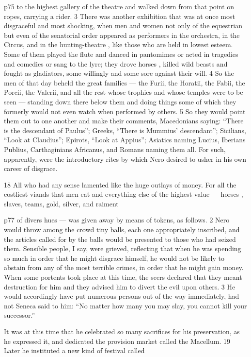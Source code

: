 p75 to the highest gallery of the theatre and walked down from that point on ropes, carrying a rider. 3 There was another exhibition that was at once most disgraceful and most shocking, when men and women not only of the equestrian but even of the senatorial order appeared as performers in the orchestra, in the Circus, and in the hunting-theatre , like those who are held in lowest esteem. Some of them played the flute and danced in pantomimes or acted in tragedies and comedies or sang to the lyre; they drove horses , killed wild beasts and fought as gladiators, some willingly and some sore against their will. 4 So the men of that day beheld the great families \texthebrew{—} the Furii, the Horatii, the Fabii, the Porcii, the Valerii, and all the rest whose trophies and whose temples were to be seen \texthebrew{—} standing down there below them and doing things some of which they formerly would not even watch when performed by others. 5 So they would point them out to one another and make their comments, Macedonians saying: ``There is the descendant of Paulus''; Greeks, ``There is Mummius' descendant''; Sicilians, ``Look at Claudius''; Epirots, ``Look at Appius''; Asiatics naming Lucius, Iberians Publius, Carthaginians Africanus, and Romans naming them all. For such, apparently, were the introductory rites by which Nero desired to usher in his own career of disgrace.

18
All who had any sense lamented like the huge outlays of money. For all the costliest viands that men eat and everything else of the highest value \texthebrew{—} horses , slaves, teams, gold, silver, and raiment

p77 of divers hues \texthebrew{—} was given away by means of tokens, as follows. 2 Nero would throw among the crowd tiny balls, each one appropriately inscribed, and the articles called for by the balls would be presented to those who had seized them. Sensible people, I say, were grieved, reflecting that when he was spending so much in order that he might disgrace himself, he would not be likely to abstain from any of the most terrible crimes, in order that he might gain money. When some portents took place at this time, the seers declared that they meant destruction for him and they advised him to divert the evil upon others. 3 He would accordingly have put numerous persons out of the way immediately, had not Seneca said to him: ``No matter how many you may slay, you cannot kill your successor.''

It was at this time that he celebrated so many sacrifices for his preservation, as he expressed it, and dedicated the provision market called the Macellum. 19 Later he instituted a new kind of festival called

